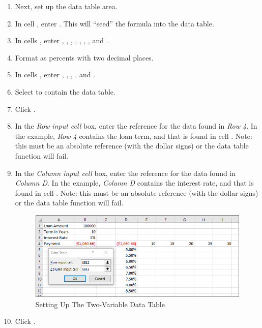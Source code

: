 \begin{enumerate}
	\item Next, set up the data table area.
	\item In cell , enter . This will ``seed'' the  formula into the data table.
	\item In cells , enter , , , , , , , and .
	\item Format  as percents with two decimal places.
	\item In cells , enter , , , , and .
	\item Select  to contain the data table.
	\item Click .
	\item In the \textit{Row input cell} box, enter the reference for the data found in \textit{Row 4}. In the example, \textit{Row 4} contains the loan term, and that is found in cell . Note: this must be an absolute reference (with the dollar signs) or the data table function will fail.
	\item In the \textit{Column input cell} box, enter the reference for the data found in \textit{Column D}. In the example, \textit{Column D} contains the interest rate, and that is found in cell . Note: this must be an absolute reference (with the dollar signs) or the data table function will fail.

	\begin{figure}[H]
		\centering
		\includegraphics[width=\maxwidth{.95\linewidth}]{gfx/ch08_fig44}
		\caption{Setting Up The Two-Variable Data Table}
		\label{08:fig44}
	\end{figure}

	\item Click .
\end{enumerate}

